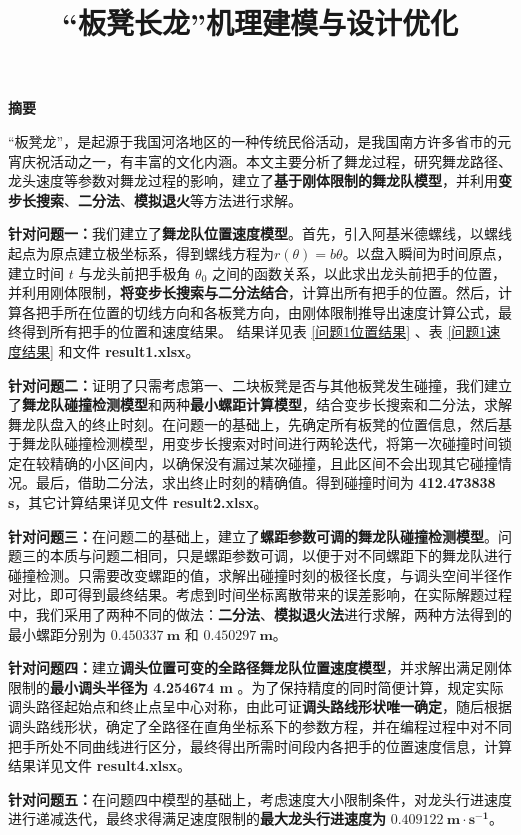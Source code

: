 \documentclass[zihao=-4, UTF8]{article}		%
\title{\textbf{“板凳长龙”机理建模与设计优化}}
\author{ }  %
\date{ }  %
\theoremstyle{MyLineTheoremStyle} %
\theoremstyle{MyBlockTheoremStyle} %
\theoremstyle{MySubsubsectionStyle} %
\newcommand{\cnabstractname}{\large 摘要}
\newenvironment{cnabstract}{%
        \par
        \noindent\mbox{}\hfill{\bfseries \cnabstractname}\hfill\mbox{}\par
        }{\par}
\begin{document}
 

\maketitle
\vspace{-80pt}

\begin{cnabstract}
    {\normalsize 
        “板凳龙”，是起源于我国河洛地区的一种传统民俗活动，是我国南方许多省市的元宵庆祝活动之一，有丰富的文化内涵。本文主要分析了舞龙过程，研究舞龙路径、龙头速度等参数对舞龙过程的影响，建立了\textbf{基于刚体限制的舞龙队模型}，并利用\textbf{变步长搜索}、\textbf{二分法}、\textbf{模拟退火}等方法进行求解。\par
        \textbf{针对问题一：}我们建立了\textbf{舞龙队位置速度模型}。首先，引入阿基米德螺线，以螺线起点为原点建立极坐标系，得到螺线方程为$r(\theta)=b\theta$。以盘入瞬间为时间原点，建立时间 $t$ 与龙头前把手极角 $\theta_0$ 之间的函数关系，以此求出龙头前把手的位置，并利用刚体限制，\textbf{将变步长搜索与二分法结合}，计算出所有把手的位置。然后，计算各把手所在位置的切线方向和各板凳方向，由刚体限制推导出速度计算公式，最终得到所有把手的位置和速度结果。
        结果详见表 \ref*{问题1位置结果} 、表 \ref*{问题1速度结果} 和文件 \textbf{result1.xlsx}。\par
        \textbf{针对问题二：}证明了只需考虑第一、二块板凳是否与其他板凳发生碰撞，我们建立了\textbf{舞龙队碰撞检测模型}和两种\textbf{最小螺距计算模型}，结合变步长搜索和二分法，求解舞龙队盘入的终止时刻。在问题一的基础上，先确定所有板凳的位置信息，然后基于舞龙队碰撞检测模型，用变步长搜索对时间进行两轮迭代，将第一次碰撞时间锁定在较精确的小区间内，以确保没有漏过某次碰撞，且此区间不会出现其它碰撞情况。最后，借助二分法，求出终止时刻的精确值。得到碰撞时间为 \textbf{412.473838 s}，其它计算结果详见文件 \textbf{result2.xlsx}。\par
        \textbf{针对问题三：}在问题二的基础上，建立了\textbf{螺距参数可调的舞龙队碰撞检测模型}。问题三的本质与问题二相同，只是螺距参数可调，以便于对不同螺距下的舞龙队进行碰撞检测。只需要改变螺距的值，求解出碰撞时刻的极径长度，与调头空间半径作对比，即可得到最终结果。考虑到时间坐标离散带来的误差影响，在实际解题过程中，我们采用了两种不同的做法：\textbf{二分法}、\textbf{模拟退火法}进行求解，两种方法得到的最小螺距分别为 $\mathbf{0.450337\ m}$ 和 $\mathbf{0.450297\ m}$。\par
        \textbf{针对问题四：}建立\textbf{调头位置可变的全路径舞龙队位置速度模型}，并求解出满足刚体限制的\textbf{最小调头半径为 4.254674 m} 。为了保持精度的同时简便计算，规定实际调头路径起始点和终止点呈中心对称，由此可证\textbf{调头路线形状唯一确定}，随后根据调头路线形状，确定了全路径在直角坐标系下的参数方程，并在编程过程中对不同把手所处不同曲线进行区分，最终得出所需时间段内各把手的位置速度信息，计算结果详见文件 \textbf{result4.xlsx}。\par
        \textbf{针对问题五：}在问题四中模型的基础上，考虑速度大小限制条件，对龙头行进速度进行递减迭代，最终求得满足速度限制的\textbf{最大龙头行进速度为} $\mathbf{0.409122\  m\cdot s^{-1}}$。

}
\end{cnabstract}
\end{document}
